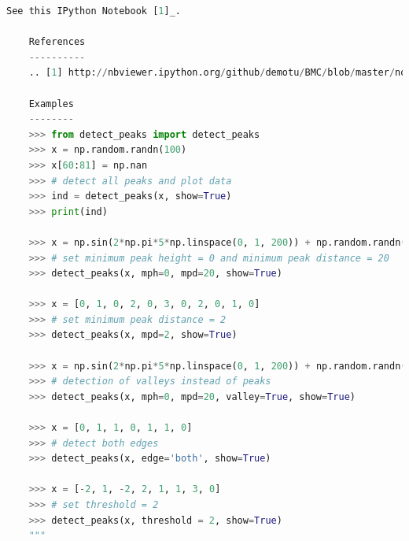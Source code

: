 \begin{lstlisting}[language=Python]
    See this IPython Notebook [1]_.

    References
    ----------
    .. [1] http://nbviewer.ipython.org/github/demotu/BMC/blob/master/notebooks/DetectPeaks.ipynb

    Examples
    --------
    >>> from detect_peaks import detect_peaks
    >>> x = np.random.randn(100)
    >>> x[60:81] = np.nan
    >>> # detect all peaks and plot data
    >>> ind = detect_peaks(x, show=True)
    >>> print(ind)

    >>> x = np.sin(2*np.pi*5*np.linspace(0, 1, 200)) + np.random.randn(200)/5
    >>> # set minimum peak height = 0 and minimum peak distance = 20
    >>> detect_peaks(x, mph=0, mpd=20, show=True)

    >>> x = [0, 1, 0, 2, 0, 3, 0, 2, 0, 1, 0]
    >>> # set minimum peak distance = 2
    >>> detect_peaks(x, mpd=2, show=True)

    >>> x = np.sin(2*np.pi*5*np.linspace(0, 1, 200)) + np.random.randn(200)/5
    >>> # detection of valleys instead of peaks
    >>> detect_peaks(x, mph=0, mpd=20, valley=True, show=True)

    >>> x = [0, 1, 1, 0, 1, 1, 0]
    >>> # detect both edges
    >>> detect_peaks(x, edge='both', show=True)

    >>> x = [-2, 1, -2, 2, 1, 1, 3, 0]
    >>> # set threshold = 2
    >>> detect_peaks(x, threshold = 2, show=True)
    """


\end{lstlisting}
